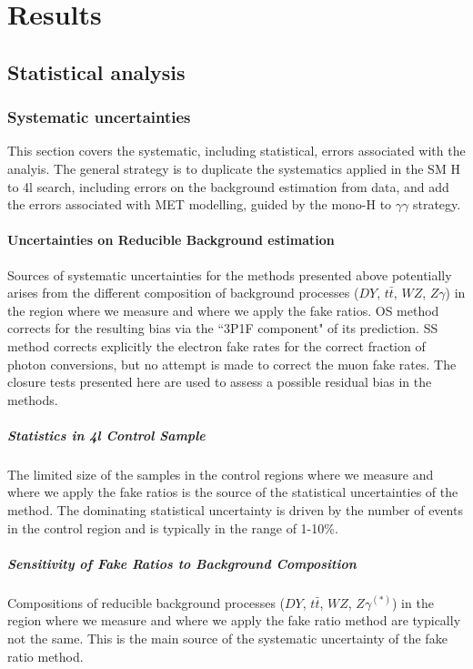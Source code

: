\chapter{Results}

\section{Statistical analysis}

\subsection{Systematic uncertainties}

This section covers the systematic, including statistical, errors associated with the analyis. The general strategy is to duplicate the systematics applied in the SM H to 4l search, including errors on the background estimation from data, and add the errors associated with MET modelling, guided by the mono-H to $\gamma\gamma$ strategy. 

\subsubsection{Uncertainties on Reducible Background estimation} %
\label{sec:zxUncert}

Sources of systematic uncertainties for the methods presented above
potentially arises from the different composition of background processes 
($DY$, $t \bar{t}$, $WZ$, $Z\gamma$) in the region where we measure and 
where we apply the fake ratios.
OS method corrects for the resulting bias via the ``3P1F component"
of its prediction. SS method corrects explicitly the electron fake rates
for the correct fraction of photon conversions, but no attempt is made 
to correct the muon fake rates.
The closure tests presented here are used to assess a possible residual
bias in the methods.

\paragraph{Statistics in 4l Control Sample}
The limited size of the samples in the control regions where we measure and where we apply the fake ratios is the source of the statistical uncertainties of the method. The dominating statistical uncertainty is driven by the number of events in the control region and is typically in the range of 1-10\%.

\paragraph{Sensitivity of Fake Ratios to Background Composition}
Compositions of reducible background processes ($DY$, $t \bar{t}$, $WZ$, $Z\gamma^{(*)}$) in the region where we measure and where we apply the fake ratio method are typically not the same. This is the main source of the systematic uncertainty of the fake ratio method.

